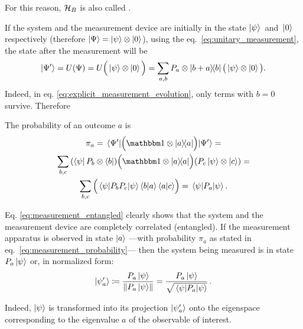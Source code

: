For this reason, $\mathcal{H}_{B}$ is also called .

If the system and the measurement device are initially in the
state $\ket{\psi}$~and~$\ket{0}$ respectively
(therefore $\ket{\Psi} = \ket{\psi} \otimes \ket{0}$),
using the eq.~\eqref{eq:unitary_measurement},
the state after the measurement will be %
%
\begin{equation}\label{eq:explicit_measurement_evolution}
  \ket{\Psi^{\prime}} = U(\Psi) = U\Big(\ket{\psi} \otimes \ket{0}\Big) =
    \sum_{a, b} P_a \otimes \ketbra{b+a}{b} \big(\ket{\psi} \otimes \ket{0}\big)
    \text{.}
\end{equation}
Indeed, in eq. \eqref{eq:explicit_measurement_evolution}, only terms with $b=0$ survive.
Therefore

The probability of an outcome $a$ is
\begin{multline}\label{eq:measurement_probability}
  \pi_{a} = \expval{\qty\Big(\idop\ox\ketbra{a})}{\Psi^{\prime}} = \\
    \sum_{b,c}
      \qty(\bra{\psi}P_{b}\ox\bra{b})
      \qty\Big(\idop\ox\ketbra{a})
      \qty(P_{c}\ket{\psi}\ox\ket{c}) = \\
    \sum_{b,c}\qty\Big(\expval{P_bP_c}{\psi} \braket{b}{a} \braket{a}{c}) =
    \expval{P_a}{\psi} \text{.}
\end{multline}

Eq. \eqref{eq:measurement_entangled} clearly shows that the system
and the measurement device are completely correlated (entangled).
If the measurement apparatus is observed in state $\ket{a}$
---with probability $\pi_{a}$ as stated in eq.~\eqref{eq:measurement_probability}---
then the system being measured is in state $P_{a}\ket{\psi}$
or, in normalized form:
\begin{equation}\label{eq:normalized_collapse}
  \ket{\psi^\prime_a} \coloneqq \frac{P_{a}\ket{\psi}}{\norm{P_{a}\ket{\psi}}}
    = \frac{P_{a}\ket{\psi}}{\sqrt{\expval{P_a}{\psi}}} \,\text{.}
\end{equation}

Indeed,
$\ket{\psi}$
is transformed
into its projection $\ket{\psi^\prime_a}$
onto the eigenspace
corresponding to the eigenvalue $a$ of the observable of interest.

